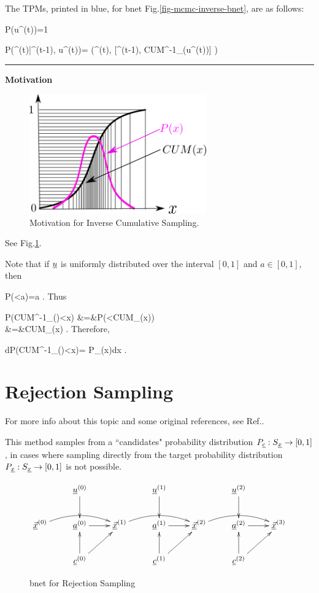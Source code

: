 The TPMs, printed
in blue, for  bnet
 Fig.\ref{fig-mcmc-inverse-bnet}, are
as follows:

\beq\color{blue}
P(u^{(t)})=1
\eeq

\beq\color{blue}
P(\vecx^{(t)}|\vecx^{(t-1)}, u^{(t)})=
\delta(\;\;\;\vecx^{(t)},
[\vecx^{(t-1)}, CUM^{-1}_\rvx(u^{(t)})]
\;\;\;)
\eeq

\hrule\noindent
{\bf Motivation}

\begin{figure}[h!]
\centering
\includegraphics[width=3in]
{mcmc/inverse.png}
\caption{Motivation 
for Inverse Cumulative Sampling.} 
\label{fig-mcmc-inverse}
\end{figure}
See Fig.\ref{fig-mcmc-inverse}.


Note that if 
${\underline{u}}$ is uniformly distributed over 
the interval $[0,1]$ and $a\in[0,1]$, then

\beq
P(\rvu<a)=a
\;.
\eeq
Thus

\beqa
P(CUM^{-1}_\rvx(\rvu)<x)
&=&P(\rvu<CUM_\rvx(x))
\\
&=&CUM_\rvx(x)
\;.
\eeqa
Therefore,

\beq
dP(CUM^{-1}_\rvx(\rvu)<x)=
P_\rvx(x)dx
\;.
\eeq


\section{Rejection Sampling}

For more info about this topic 
and some original references, 
see Ref.\cite{wiki-reject}.

This method samples
from a ``candidates" probability distribution
$P_{\underline{c}}:S_{\underline{x}}\rightarrow [0,1]$,
in cases where sampling directly
from the
target probability distribution
$P_{\underline{x}}:S_{\underline{x}}\rightarrow [0,1]$
is not possible.


\begin{figure}[h!]
$$\xymatrix{
&\rvu^{(0)}\ar[d]
&&\rvu^{(1)}\ar[d]
&&\rvu^{(2)}\ar[d]
\\
\ul{\vecx}^{(0)}\ar@/^1pc/[rr]
&\rva^{(0)}\ar[r]
&
\ul{\vecx}^{(1)}\ar@/^1pc/[rr]
&\rva^{(1)}\ar[r]
&
\ul{\vecx}^{(2)}\ar@/^1pc/[rr]
&\rva^{(2)}\ar[r]
&\ul{\vecx}^{(3)}
\\
&\rvc^{(0)}\ar[u]\ar[ru]
&&\rvc^{(1)}\ar[u]\ar[ru]
&&\rvc^{(2)}\ar[u]\ar[ru]
}$$
\caption{bnet for Rejection Sampling}
\label{fig-mcmc-reject-bnet}
\end{figure}


